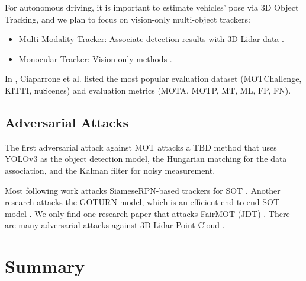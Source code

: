 For autonomous driving, it is important to estimate vehicles' pose via 3D Object Tracking, and we plan to focus on vision-only multi-object trackers: 

\begin{itemize}
    \item Multi-Modality Tracker: Associate detection results with 3D Lidar data \citep{weng20203d}.
    \item Monocular Tracker:  Vision-only methods \citep{wu2021track} \citep{hu2022monocular}.
\end{itemize}

In \citep{ciaparrone2020deep}, Ciaparrone et al. listed the most popular evaluation dataset (MOTChallenge, KITTI, nuScenes) and evaluation metrics (MOTA, MOTP, MT, ML, FP, FN).



\subsection{Adversarial Attacks}

The first adversarial attack against MOT attacks a TBD method that uses YOLOv3 as the object detection model, the Hungarian matching for the data association, and the Kalman filter for noisy measurement.

Most following work attacks SiameseRPN-based trackers for SOT \citep{wu2019sta} \citep{liang2020efficient} \citep{guo2020spark} \citep{chen2020one} \citep{yan2020cooling}. Another research attacks the GOTURN model, which is an efficient end-to-end SOT model \citep{wiyatno2019physical}. We only find one research paper that attacks FairMOT (JDT) \citep{lin2021trasw}. There are many adversarial attacks against 3D Lidar Point Cloud \citep{cheng2021universal} \citep{cheng2022non} \citep{wang2022adversary}.

\section{Summary}

